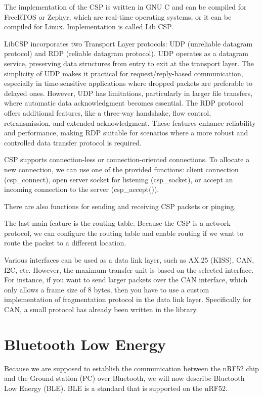 \documentclass[conference]{IEEEtran}
\begin{document}
The implementation of the CSP is written in GNU C and can be compiled for FreeRTOS or Zephyr, which are real-time operating systems, or it can be compiled for Linux. Implementation is called Lib CSP.\cite{libcsp}

LibCSP incorporates two Transport Layer protocols: UDP (unreliable datagram protocol) and RDP (reliable datagram protocol). UDP operates as a datagram service, preserving data structures from entry to exit at the transport layer. The simplicity of UDP makes it practical for request/reply-based communication, especially in time-sensitive applications where dropped packets are preferable to delayed ones. However, UDP has limitations, particularly in larger file transfers, where automatic data acknowledgment becomes essential. The RDP protocol offers additional features, like a three-way handshake, flow control, retransmission, and extended acknowledgment. These features enhance reliability and performance, making RDP suitable for scenarios where a more robust and controlled data transfer protocol is required.

CSP supports connection-less or connection-oriented connections. To allocate a new connection, we can use one of the provided functions: client connection (csp\_connect), open server socket for listening (csp\_socket), or accept an incoming connection to the server (csp\_accept()).

There are also functions for sending and receiving CSP packets or pinging.

The last main feature is the routing table. Because the CSP is a network protocol, we can configure the routing table and enable routing if we want to route the packet to a different location.

Various interfaces can be used as a data link layer, such as AX.25 (KISS), CAN, I2C, etc. However, the maximum transfer unit is based on the selected interface. For instance, if you want to send larger packets over the CAN interface, which only allows a frame size of 8 bytes, then you have to use a custom implementation of fragmentation protocol in the data link layer. Specifically for CAN, a small protocol has already been written in the library.

\section{Bluetooth Low Energy}
Because we are supposed to establish the communication between the nRF52 chip and the Ground station (PC) over Bluetooth, we will now describe Bluetooth Low Energy (BLE). BLE is a standard that is supported on the nRF52.
\end{document}
